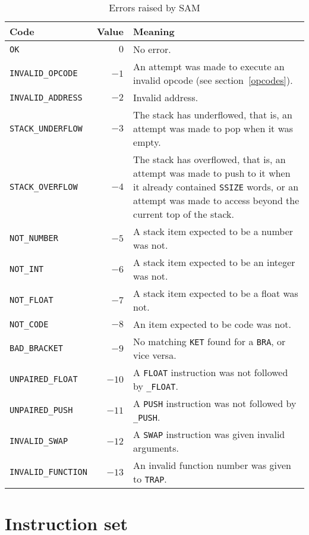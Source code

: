 \documentclass[english]{scrartcl}
\begin{document}
\begin{table}[htbp]
  \begin{center}
    \begin{tabular}{lrp{2.5in}} \toprule
      \textbf{Code} & \textbf{Value} & \textbf{Meaning} \\ \midrule
      {\tt OK} & $0$ & No error. \\
      {\tt INVALID\_OPCODE} & $-1$ & An attempt was made to execute an invalid opcode (see section~\ref{opcodes}). \\
      {\tt INVALID\_ADDRESS} & $-2$ & Invalid address. \\
      {\tt STACK\_UNDERFLOW} & $-3$ & The stack has underflowed, that is, an attempt was made to pop when it was empty. \\
      {\tt STACK\_OVERFLOW} & $-4$ & The stack has overflowed, that is, an attempt was made to push to it when it already contained {\tt SSIZE} words, or an attempt was made to access beyond the current top of the stack. \\
      {\tt NOT\_NUMBER} & $-5$ & A stack item expected to be a number was not. \\
      {\tt NOT\_INT} & $-6$ & A stack item expected to be an integer was not. \\
      {\tt NOT\_FLOAT} & $-7$ & A stack item expected to be a float was not. \\
      {\tt NOT\_CODE} & $-8$ & An item expected to be code was not. \\
      {\tt BAD\_BRACKET} & $-9$ & No matching {\tt KET} found for a {\tt BRA}, or vice versa. \\
      {\tt UNPAIRED\_FLOAT} & $-10$ & A {\tt FLOAT} instruction was not followed by {\tt \_FLOAT}. \\
      {\tt UNPAIRED\_PUSH} & $-11$ & A {\tt PUSH} instruction was not followed by {\tt \_PUSH}. \\
      {\tt INVALID\_SWAP} & $-12$ & A {\tt SWAP} instruction was given invalid arguments. \\
      {\tt INVALID\_FUNCTION} & $-13$ & An invalid function number was given to  {\tt TRAP}. \\
      \bottomrule
\end{tabular}
\caption{\label{excepttable}Errors raised by SAM}
\end{center}
\end{table}


\section{Instruction set}
\label{instset}
\end{document}
